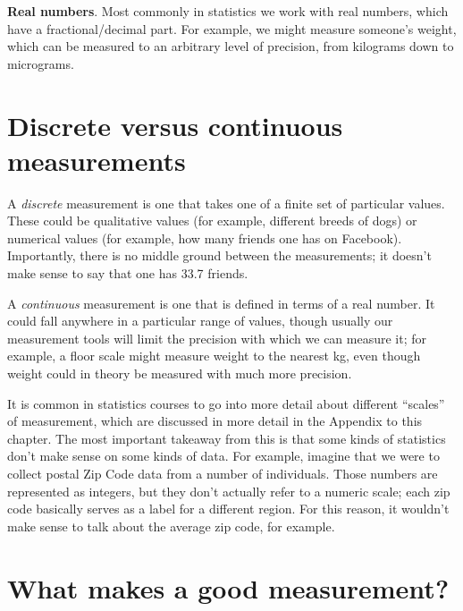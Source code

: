 \documentclass[
  12pt,
]{book}
\begin{document}
\textbf{Real numbers}. Most commonly in statistics we work with real numbers, which have a fractional/decimal part. For example, we might measure someone's weight, which can be measured to an arbitrary level of precision, from kilograms down to micrograms.

\hypertarget{discrete-versus-continuous-measurements}{%
\section{Discrete versus continuous measurements}\label{discrete-versus-continuous-measurements}}

A \emph{discrete} measurement is one that takes one of a finite set of particular values. These could be qualitative values (for example, different breeds of dogs) or numerical values (for example, how many friends one has on Facebook). Importantly, there is no middle ground between the measurements; it doesn't make sense to say that one has 33.7 friends.

A \emph{continuous} measurement is one that is defined in terms of a real number. It could fall anywhere in a particular range of values, though usually our measurement tools will limit the precision with which we can measure it; for example, a floor scale might measure weight to the nearest kg, even though weight could in theory be measured with much more precision.

It is common in statistics courses to go into more detail about different ``scales'' of measurement, which are discussed in more detail in the Appendix to this chapter. The most important takeaway from this is that some kinds of statistics don't make sense on some kinds of data. For example, imagine that we were to collect postal Zip Code data from a number of individuals. Those numbers are represented as integers, but they don't actually refer to a numeric scale; each zip code basically serves as a label for a different region. For this reason, it wouldn't make sense to talk about the average zip code, for example.

\hypertarget{what-makes-a-good-measurement}{%
\section{What makes a good measurement?}\label{what-makes-a-good-measurement}}
\end{document}
